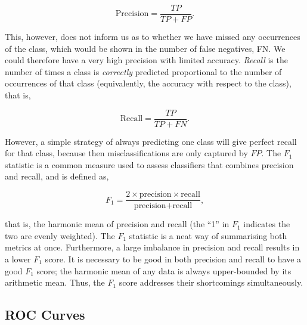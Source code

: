 \documentclass[11pt]{amsart}
\begin{document}
$$
\text{Precision} = \frac{TP}{TP + FP}.
$$

This, however, does not inform us as to whether we have missed any occurrences of the class, which would be shown in the number of false negatives, FN. We could therefore have a very high precision with limited accuracy. \emph{Recall} is the number of times a class is \emph{correctly} predicted proportional to the number of occurrences of that class (equivalently, the accuracy with respect to the class), that is,

$$
\text{Recall} = \frac{TP}{TP + FN}.
$$

However, a simple strategy of always predicting one class will give perfect recall for that class, because then misclassifications are only captured by $FP$. The $F_1$ statistic is a common measure used to assess classifiers that combines precision and recall, and is defined as,

$$
F_1 = \frac{2 \times \text{precision} \times \text{recall}}{\text{precision} + \text{recall}},
$$

that is, the harmonic mean of precision and recall (the ``1'' in $F_1$ indicates the two are evenly weighted). The $F_1$ statistic is a neat way of summarising both metrics at once. Furthermore, a large imbalance in precision and recall results in a lower $F_1$ score. It is necessary to be good in both precision and recall to have a good $F_1$ score; the harmonic mean of any data is always upper-bounded by its arithmetic mean. Thus, the $F_1$ score addresses their shortcomings simultaneously.

\subsection{ROC Curves}
\end{document}
